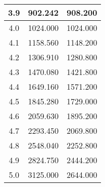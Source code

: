 \begin{table}[h!]
\begin{tabular}{|c|c|c|}
        3.9        & 902.242        & 908.200                          \\ \hline
        4.0        & 1024.000       & 1024.000                         \\ \hline
        4.1        & 1158.560       & 1148.200                         \\ \hline
        4.2        & 1306.910       & 1280.800                         \\ \hline
        4.3        & 1470.080       & 1421.800                         \\ \hline
        4.4        & 1649.160       & 1571.200                         \\ \hline
        4.5        & 1845.280       & 1729.000                         \\ \hline
        4.6        & 2059.630       & 1895.200                         \\ \hline
        4.7        & 2293.450       & 2069.800                         \\ \hline
        4.8        & 2548.040       & 2252.800                         \\ \hline
        4.9        & 2824.750       & 2444.200                         \\ \hline
        5.0        & 3125.000       & 2644.000                         \\ \hline
    \end{tabular}\label{tab:table5}
\end{table}
